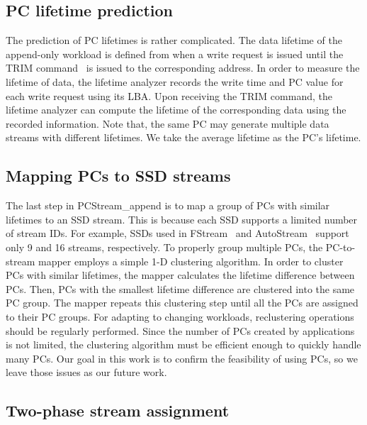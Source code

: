 \subsection{PC lifetime prediction}

The prediction of PC lifetimes is rather complicated. 
The data lifetime of the append-only workload is defined 
from when a write request is issued until the TRIM command~\cite{TRIM} is issued to 
the corresponding address.
In order to measure the lifetime of data, the lifetime analyzer 
records the write time and PC value for each write request using its LBA.
Upon receiving the TRIM command, the lifetime analyzer can compute the 
lifetime of the corresponding data using the recorded information.
Note that, the
same PC may generate multiple data streams with different lifetimes.
We take the average lifetime as the PC's lifetime.

\subsection{Mapping PCs to SSD streams}

The last step in \textsf{\small PCStream\_append} is to map
a group of PCs with similar lifetimes to an SSD stream.
This is because each SSD supports a limited number of stream IDs. For
example, SSDs used in \textsf{\small FStream}~\cite{FStream} and \textsf{\small AutoStream}~\cite{AutoStream}
support only 9 and 16 streams, respectively. To properly group multiple PCs,
the PC-to-stream mapper employs a simple 1-D clustering algorithm. 
In order to cluster PCs with similar lifetimes, the mapper calculates the 
lifetime difference between PCs.
Then, PCs with the smallest lifetime difference are clustered into the same PC group. 
The mapper repeats this clustering step until all the PCs are assigned to their PC groups.
For adapting to changing
workloads, reclustering operations should be regularly performed. Since the
number of PCs created by applications is not limited, the clustering algorithm
must be efficient enough to quickly handle many PCs. Our goal in this work is
to confirm the feasibility of using PCs, so we leave
those issues as our future work.

\subsection{Two-phase stream assignment}

